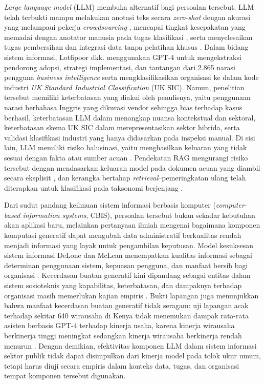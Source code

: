 \documentclass[12pt,a4paper]{report}
\begin{document}
\textit{Large language model} (LLM) membuka alternatif bagi persoalan tersebut. LLM telah terbukti mampu melakukan anotasi teks secara \textit{zero-shot} dengan akurasi yang melampaui pekerja \textit{crowdsourcing} \cite{gilardi2023chatgpt}, mencapai tingkat kesepakatan yang memadai dengan anotator manusia pada tugas klasifikasi \cite{ziems2024css}, serta menyelesaikan tugas pembersihan dan integrasi data tanpa pelatihan khusus \cite{narayan2022wrangle}. Dalam bidang sistem informasi, Lotfipoor dkk. \cite{lotfipoor2026llm} menggunakan GPT-4 untuk mengekstraksi pendorong adopsi, strategi implementasi, dan tantangan dari 2.865 narasi pengguna \textit{business intelligence} serta mengklasifikasikan organisasi ke dalam kode industri \textit{UK Standard Industrial Classification} (UK SIC). Namun, penelitian tersebut memiliki keterbatasan yang diakui oleh penulisnya, yaitu penggunaan narasi berbahasa Inggris yang dikurasi vendor sehingga bias terhadap kasus berhasil, keterbatasan LLM dalam menangkap nuansa kontekstual dan sektoral, keterbatasan skema UK SIC dalam merepresentasikan sektor hibrida, serta validasi klasifikasi industri yang hanya didasarkan pada inspeksi manual. Di sisi lain, LLM memiliki risiko halusinasi, yaitu menghasilkan keluaran yang tidak sesuai dengan fakta atau sumber acuan \cite{ji2023hallucination,dahl2024legal}. Pendekatan RAG mengurangi risiko tersebut dengan mendasarkan keluaran model pada dokumen acuan yang diambil secara eksplisit \cite{gao2023ragsurvey,oche2025rag}, dan kerangka bertahap \textit{retrieval}--pemeringkatan ulang telah diterapkan untuk klasifikasi pada taksonomi berjenjang \cite{achananuparp2025occupation}.

Dari sudut pandang keilmuan sistem informasi berbasis komputer (\textit{computer-based information systems}, CBIS), persoalan tersebut bukan sekadar kebutuhan akan aplikasi baru, melainkan pertanyaan ilmiah mengenai bagaimana komponen komputasi generatif dapat mengubah data administratif berkualitas rendah menjadi informasi yang layak untuk pengambilan keputusan. Model kesuksesan sistem informasi DeLone dan McLean menempatkan kualitas informasi sebagai determinan penggunaan sistem, kepuasan pengguna, dan manfaat bersih bagi organisasi \cite{delone2003success}. Kecerdasan buatan generatif kini dipandang sebagai entitas dalam sistem sosioteknis yang kapabilitas, keterbatasan, dan dampaknya terhadap organisasi masih memerlukan kajian empiris \cite{feuerriegel2024genai,dwivedi2023chatgpt}. Bukti lapangan juga menunjukkan bahwa manfaat kecerdasan buatan generatif tidak seragam: uji lapangan acak terhadap sekitar 640 wirausaha di Kenya tidak menemukan dampak rata-rata asisten berbasis GPT-4 terhadap kinerja usaha, karena kinerja wirausaha berkinerja tinggi meningkat sedangkan kinerja wirausaha berkinerja rendah menurun \cite{otis2026uneven}. Dengan demikian, efektivitas komponen LLM dalam sistem informasi sektor publik tidak dapat disimpulkan dari kinerja model pada tolok ukur umum, tetapi harus diuji secara empiris dalam konteks data, tugas, dan organisasi tempat komponen tersebut digunakan.
\end{document}
